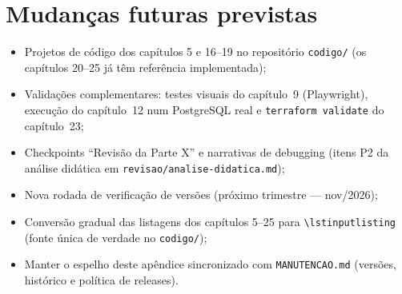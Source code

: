 \section{Mudanças futuras previstas}

\begin{itemize}[leftmargin=*, itemsep=0.4em]
  \item Projetos de código dos capítulos 5 e 16--19 no repositório
  \texttt{codigo/} (os capítulos 20--25 já têm referência implementada);
  \item Validações complementares: testes visuais do capítulo~9 (Playwright),
  execução do capítulo~12 num PostgreSQL real e \texttt{terraform validate}
  do capítulo~23;
  \item Checkpoints ``Revisão da Parte X'' e narrativas de debugging (itens P2
  da análise didática em \texttt{revisao/analise-didatica.md});
  \item Nova rodada de verificação de versões (próximo trimestre — nov/2026);
  \item Conversão gradual das listagens dos capítulos 5--25 para
  \texttt{\textbackslash lstinputlisting} (fonte única de verdade no \texttt{codigo/});
  \item Manter o espelho deste apêndice sincronizado com \texttt{MANUTENCAO.md}
  (versões, histórico e política de releases).
\end{itemize}
